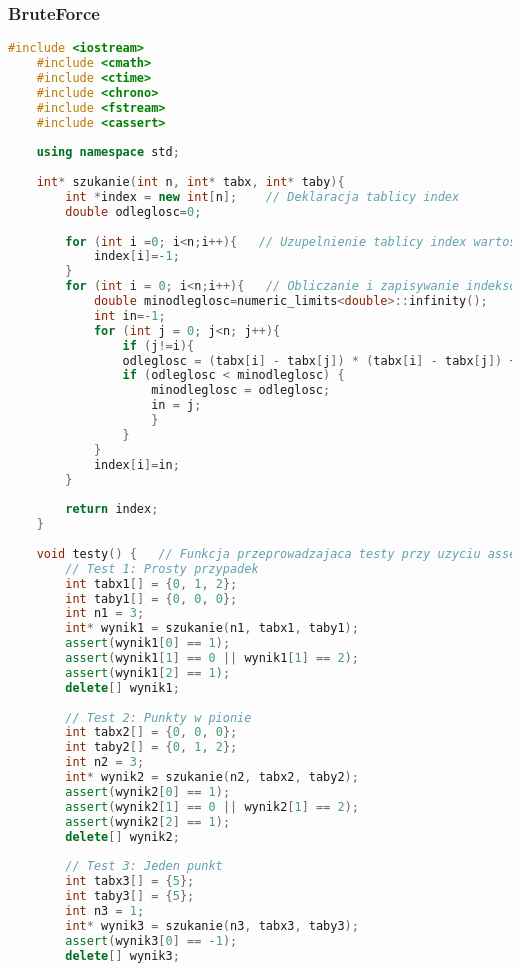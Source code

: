 \documentclass[12pt,twoside]{article}
\begin{document}
\subsubsection{BruteForce}
\begin{lstlisting}[language=C++,caption=Kod BruteForce,label={bruteforcekod}]
    #include <iostream>
    #include <cmath>
    #include <ctime>
    #include <chrono>
    #include <fstream>
    #include <cassert>
    
    using namespace std;
    
    int* szukanie(int n, int* tabx, int* taby){
        int *index = new int[n];    // Deklaracja tablicy index
        double odleglosc=0;
        
        for (int i =0; i<n;i++){   // Uzupelnienie tablicy index wartosciami -1 aby miec pewnosc ze nie beda mialy wplyw na wynik
            index[i]=-1;
        }	
        for (int i = 0; i<n;i++){   // Obliczanie i zapisywanie indeksow najblizszych sasiadow
            double minodleglosc=numeric_limits<double>::infinity();
            int in=-1;
            for (int j = 0; j<n; j++){
                if (j!=i){
                odleglosc = (tabx[i] - tabx[j]) * (tabx[i] - tabx[j]) + (taby[i] - taby[j]) * (taby[i] - taby[j]);
                if (odleglosc < minodleglosc) {
                    minodleglosc = odleglosc;
                    in = j;				
                    }
                }
            }
            index[i]=in;		
        }
        
        return index;
    }
    
    void testy() {   // Funkcja przeprowadzajaca testy przy uzyciu assert
        // Test 1: Prosty przypadek
        int tabx1[] = {0, 1, 2};
        int taby1[] = {0, 0, 0};
        int n1 = 3;
        int* wynik1 = szukanie(n1, tabx1, taby1);
        assert(wynik1[0] == 1);
        assert(wynik1[1] == 0 || wynik1[1] == 2);
        assert(wynik1[2] == 1);
        delete[] wynik1;
    
        // Test 2: Punkty w pionie
        int tabx2[] = {0, 0, 0};
        int taby2[] = {0, 1, 2};
        int n2 = 3;
        int* wynik2 = szukanie(n2, tabx2, taby2);
        assert(wynik2[0] == 1);
        assert(wynik2[1] == 0 || wynik2[1] == 2);
        assert(wynik2[2] == 1);
        delete[] wynik2;
    
        // Test 3: Jeden punkt
        int tabx3[] = {5};
        int taby3[] = {5};
        int n3 = 1;
        int* wynik3 = szukanie(n3, tabx3, taby3);
        assert(wynik3[0] == -1);
        delete[] wynik3;
        

\end{lstlisting}
\end{document}
